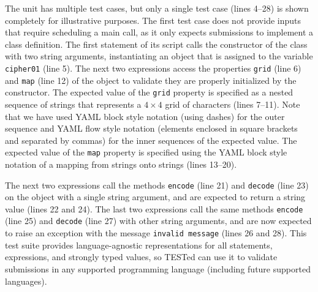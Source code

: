 \documentclass[../main]{subfiles}
\begin{document}
The unit has multiple test cases, but only a single test case (lines 4--28) is shown completely for illustrative purposes.
The first test case does not provide inputs that require scheduling a main call, as it only expects submissions to implement a class definition.
The first statement of its script calls the constructor of the class with two string arguments, instantiating an object that is assigned to the variable \texttt{cipher01} (line 5).
The next two expressions access the properties \texttt{grid} (line 6) and \texttt{map} (line 12) of the object to validate they are properly initialized by the constructor.
The expected value of the \texttt{grid} property is specified as a nested sequence of strings that represents a $ 4 \times 4 $ grid of characters (lines 7--11).
Note that we have used YAML block style notation (using dashes) for the outer sequence and YAML flow style notation (elements enclosed in square brackets and separated by commas) for the inner sequences of the expected value.
The expected value of the \texttt{map} property is specified using the YAML block style notation of a mapping from strings onto strings (lines 13--20).

The next two expressions call the methods \texttt{encode} (line 21) and \texttt{decode} (line 23) on the object with a single string argument, and are expected to return a string value (lines 22 and 24).
The last two expressions call the same methods \texttt{encode} (line 25) and \texttt{decode} (line 27) with other string arguments, and are now expected to raise an exception with the message \texttt{invalid message} (lines 26 and 28).
This test suite provides language-agnostic representations for all statements, expressions, and strongly typed values, so TESTed can use it to validate submissions in any supported programming language (including future supported languages).
\end{document}
